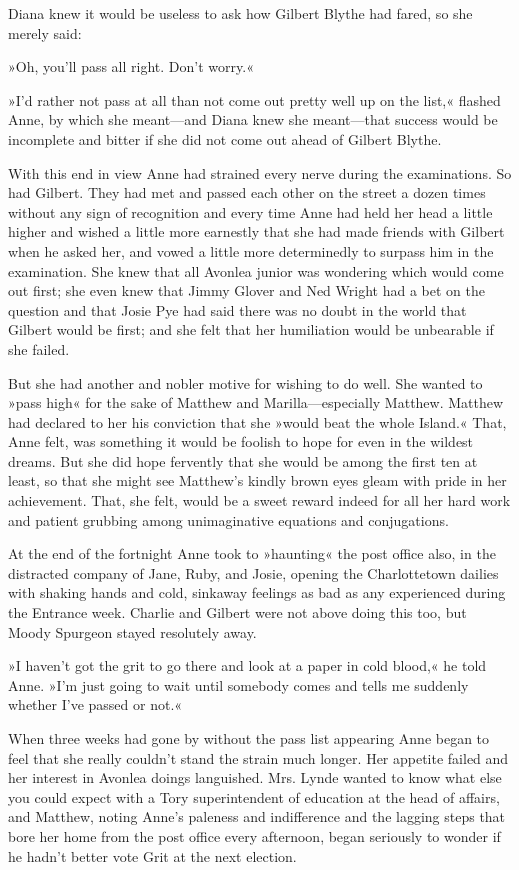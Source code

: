Diana knew it would be useless to ask how Gilbert Blythe had fared, so she merely said:

»Oh, you’ll pass all right. Don’t worry.«

»I’d rather not pass at all than not come out pretty well up on the list,« flashed Anne, by which she meant—and Diana knew she meant—that success would be incomplete and bitter if she did not come out ahead of Gilbert Blythe.

With this end in view Anne had strained every nerve during the examinations. So had Gilbert. They had met and passed each other on the street a dozen times without any sign of recognition and every time Anne had held her head a little higher and wished a little more earnestly that she had made friends with Gilbert when he asked her, and vowed a little more determinedly to surpass him in the examination. She knew that all Avonlea junior was wondering which would come out first; she even knew that Jimmy Glover and Ned Wright had a bet on the question and that Josie Pye had said there was no doubt in the world that Gilbert would be first; and she felt that her humiliation would be unbearable if she failed.

But she had another and nobler motive for wishing to do well. She wanted to »pass high« for the sake of Matthew and Marilla—especially Matthew. Matthew had declared to her his conviction that she »would beat the whole Island.« That, Anne felt, was something it would be foolish to hope for even in the wildest dreams. But she did hope fervently that she would be among the first ten at least, so that she might see Matthew’s kindly brown eyes gleam with pride in her achievement. That, she felt, would be a sweet reward indeed for all her hard work and patient grubbing among unimaginative equations and conjugations.

At the end of the fortnight Anne took to »haunting« the post office also, in the distracted company of Jane, Ruby, and Josie, opening the Charlottetown dailies with shaking hands and cold, sinkaway feelings as bad as any experienced during the Entrance week. Charlie and Gilbert were not above doing this too, but Moody Spurgeon stayed resolutely away.

»I haven’t got the grit to go there and look at a paper in cold blood,« he told Anne. »I’m just going to wait until somebody comes and tells me suddenly whether I’ve passed or not.«

When three weeks had gone by without the pass list appearing Anne began to feel that she really couldn’t stand the strain much longer. Her appetite failed and her interest in Avonlea doings languished. Mrs. Lynde wanted to know what else you could expect with a Tory superintendent of education at the head of affairs, and Matthew, noting Anne’s paleness and indifference and the lagging steps that bore her home from the post office every afternoon, began seriously to wonder if he hadn’t better vote Grit at the next election.


